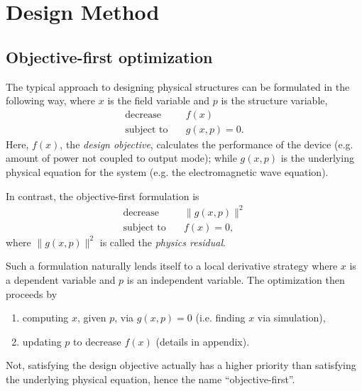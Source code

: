 \documentclass[letterpaper,10pt]{article}
\begin{document}
\section{Design Method}
\subsection{Objective-first optimization}
The typical approach to designing physical structures can be formulated 
    in the following way, 
    where $x$ is the field variable and $p$ is the structure variable,
    \begin{subequations}\label{eq:adj}
    \begin{align} 
    \text{decrease} & \quad f(x) \label{eq:adj:obj} \\ 
    \text{subject to} & \quad g(x,p) = 0. \label{eq:adj:con}
    \end{align}
    \end{subequations}
Here, $f(x)$, the \emph{design objective}, 
    calculates the performance of the device 
    (e.g. amount of power not coupled to output mode); 
    while $g(x,p)$ is the underlying physical equation for the system
    (e.g. the electromagnetic wave equation).

In contrast, the objective-first formulation is
    \begin{subequations}\label{eq:ob1}
    \begin{align} 
    \text{decrease} & \quad \|g(x,p)\|^2 \label{eq:ob1:obj} \\ 
    \text{subject to} & \quad f(x) = 0, \label{eq:ob1:con}
    \end{align}
    \end{subequations}
where $\|g(x,p)\|^2$ is called the \emph{physics residual}.
 
Such a formulation naturally lends itself to a local derivative strategy where 
    $x$ is a dependent variable and 
    $p$ is an independent variable. 
The optimization then proceeds by 
    \begin{enumerate}
    \item computing $x$, given $p$, via $g(x,p) = 0$
        (i.e. finding $x$ via simulation),
    \item updating $p$ to decrease $f(x)$ (details in appendix).
    \end{enumerate}

Not, satisfying the design objective actually has a higher priority than 
    satisfying the underlying physical equation,
    hence the name ``objective-first''.
\end{document}

